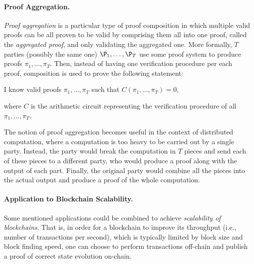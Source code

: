 \paragraph*{Proof Aggregation.} \textit{Proof aggregation} is a particular type of proof composition in which multiple valid proofs can be all proven to be valid by comprising them all into one proof, called the \textit{aggregated proof}, and only validating the aggregated one. More formally, $T$ parties (possibly the same one) $\P_1, \dots, \P_T$ use some proof system to produce proofs $\pi_1, \dots, \pi_T$. Then, instead of having one verification procedure per each proof, composition is used to prove the following statement:
\begin{center}
	I know valid proofs $\pi_1, \dots, \pi_T$ such that $C(\pi_1, \dots, \pi_T) = 0$,
\end{center}
where $C$ is the arithmetic circuit representing the verification procedure of all $\pi_1, \dots, \pi_T$.

The notion of proof aggregation becomes useful in the context of distributed computation, where a computation is too heavy to be carried out by a single party. Instead, the party would break the computation in $T$ pieces and send each of these pieces to a different party, who would produce a proof along with the output of each part. Finally, the original party would combine all the pieces into the actual output and produce a proof of the whole computation.


\paragraph*{Application to Blockchain Scalability.} Some mentioned applications could be combined to achieve \textit{scalability of blockchains}. That is, in order for a blockchain to improve its throughput (i.e., number of transactions per second), which is typically limited by block size and block finding speed, one can choose to perform transactions off-chain and publish a proof of correct state evolution on-chain.

